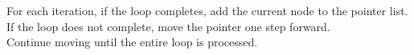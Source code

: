 \documentclass[preview]{standalone}
\begin{document}
For each iteration, if the loop completes, add the current node to the pointer list.\\If the loop does not complete, move the pointer one step forward.\\Continue moving until the entire loop is processed.\\
\end{document}
